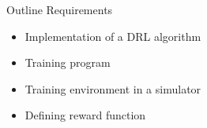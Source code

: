 \begin{frame}{Outline Requirements}

\begin{itemize}
   \item Implementation of a DRL algorithm
   \item Training program
   \item Training environment in a simulator
   \item Defining reward function
\end{itemize}

\end{frame}
